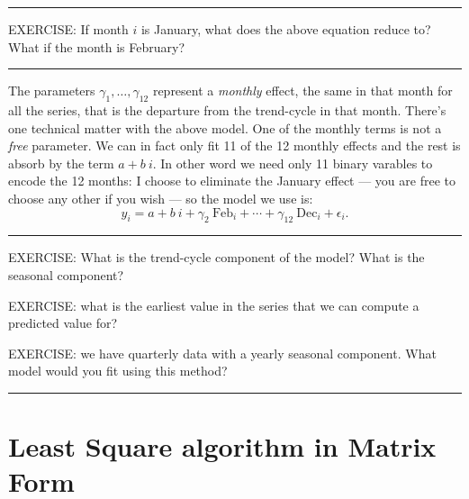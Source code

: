 \documentclass[a4paper,11pt,oneside,onecolumn]{book}
\begin{document}
\vspace{.2cm}

\noindent\rule[.15 cm]{\linewidth}{.01 cm}

\noindent EXERCISE: If month $i$ is January, what does the above
equation reduce to? What if the month is February?


\noindent\rule[.15 cm]{\linewidth}{.01 cm}

\vspace{.2cm}


 The parameters $\gamma_1,\ldots,\gamma_{12}$ represent a
\textit{monthly} effect, the same in that month for all the series, that
is the departure from the trend-cycle in that month. 
There's one technical matter with the above model. One of the
monthly terms is not a \textit{free} parameter. We can in fact only fit
11 of the 12 monthly effects and the rest is absorb by the term $a + b\ i$.
In other word we need only 11 binary varables to encode the 12 months:   
 I choose to eliminate the January effect
--- you are free to choose any other if you wish --- so the model we use is:
\[ y_i = a + b\ i + \gamma_2\ \text{Feb}_i + \cdots
+ \gamma_{12}\ \text{Dec}_i + \epsilon_i. \]



\noindent\rule[.15 cm]{\linewidth}{.01 cm}

\noindent EXERCISE: What is the trend-cycle
component of the model? What is the seasonal component?


\noindent EXERCISE: what is the earliest value in the series that we
can compute a predicted value for?

\vspace{.2cm}

\noindent EXERCISE: we have quarterly data with a yearly seasonal
component. What model would you fit using this method?

\noindent\rule[.15 cm]{\linewidth}{.01 cm}
\vspace{.5cm}



\section{Least Square algorithm in Matrix Form}
\end{document}

